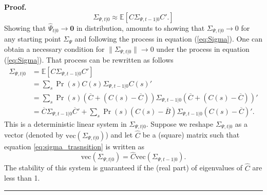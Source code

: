 \documentclass[thmsb,11pt]{article}
\newenvironment{proof}[1][Proof]{\noindent \textbf{#1.} }{\  \rule{0.5em}{0.5em}}
\begin{document}
\begin{proof}
	\begin{equation}
		\Sigma_{\Psi,t|0} \approx \mathbb{E}[C \Sigma_{\Psi,t-1|0} C'.] \label{eq:Sigma}
	\end{equation}  Showing that $\hat{\Psi}_{t|0} \rightarrow \bm 0$ in distribution, amounts to showing that $\Sigma_{\Psi,t|0}\rightarrow 0$ for any starting point $\Sigma_{\Psi}$ and following the process in equation (\ref{eq:Sigma}).  One can obtain a necessary condition for $\|\Sigma_{\Psi,t|0}\|\rightarrow 0$ under the process in equation (\ref{eq:Sigma}).
	That process can be rewritten as follows
	\begin{align}
		\Sigma_{\Psi,t|0} &= \mathbb{E}[C \Sigma_{\Psi,t-1|0} C']\\
				    &=\sum_s \Pr(s) C(s) \Sigma_{\Psi,t-1|0} C(s)'\\
				   &=\sum_s \Pr(s) (\overline C+(C(s)-\overline C))\Sigma_{\Psi,t-1|0}(\overline C+(C(s)-\overline C))'\\
				  &=\overline C \Sigma_{\Psi,t-1|0}\overline C' +\sum_s\Pr(s) (C(s)-\overline B)\Sigma_{\Psi,t-1|0}(C(s)-\overline C)'.\label{eq:sigma_trasnsition}
	\end{align}
% 	
 	This is a deterministic linear system in $\Sigma_{\Psi,t|0}$. Suppose we reshape $\Sigma_{\Psi,t|0}$  as a vector (denoted by $\text{vec}(\Sigma_{\Psi,t|0})$) and let $\hat{C}$ be a (square) matrix such that equation \ref{eq:sigma_trasnsition} is written as
% 	
 \[\text{vec}(\Sigma_{\Psi,t|0})=\hat{C}\text{vec}( \Sigma_{\Psi,t-1|0}).\]	
%
 The stability of this system is guaranteed if the (real part) of eigenvalues of $\hat{C}$ are less than 1.
 \end{proof}
\end{document}
